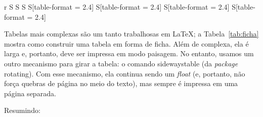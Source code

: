 \begin{longtable}[c]{
  r
  S
  S
  S
  S[table-format = 2.4] %
  S[table-format = 2.4]
  S[table-format = 2.4]
  S[table-format = 2.4]
  }
\end{longtable}
\egroup %

Tabelas mais complexas são um tanto trabalhosas em \LaTeX{}; a
Tabela~\ref{tab:ficha} mostra como construir uma tabela em forma de ficha.
Além de complexa, ela é larga e, portanto, deve ser impressa em modo
paisagem. No entanto, usamos um outro mecanismo para girar a tabela: o
comando \textsf{sidewaystable} (da \textit{package} \textsf{rotating}).
Com esse mecanismo, ela continua sendo um \textit{float} (e, portanto,
não força quebras de página no meio do texto), mas sempre é impressa em
uma página separada.

Resumindo:

